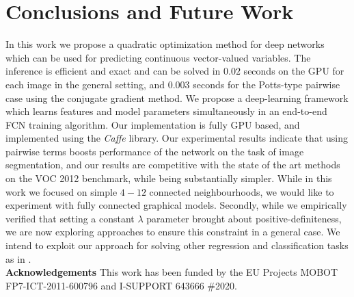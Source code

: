 \documentclass[runningheads]{llncs}
\begin{document}
\section{Conclusions and Future Work}
In this work we propose a quadratic optimization method for deep networks which
can be used for predicting continuous vector-valued variables. The inference is efficient
and exact and can be solved in $0.02$ seconds on the GPU for each image in the general setting, and $0.003$ seconds for the Potts-type pairwise case using the conjugate gradient method.
We propose a deep-learning framework which learns features and model parameters simultaneously in an end-to-end FCN training algorithm.
Our implementation is fully GPU based, and implemented using the \emph{Caffe} library.
Our experimental results indicate that using pairwise terms boosts performance of the network
on the task of image segmentation, and our results are competitive with the state of the art methods
on the VOC 2012 benchmark, while being substantially simpler. While in this work we focused on simple $4-12$ connected neighbourhoods, we would like to experiment with fully connected graphical
models. Secondly, while we empirically verified that setting a constant $\lambda$ parameter brought about positive-definiteness, we are now exploring approaches to ensure this constraint in a general case. We intend to exploit our approach for solving other regression and classification tasks as in \cite{eigen2015predicting,ubernet}.
\\[1mm]


\noindent \textbf{Acknowledgements}
This work has been funded by the EU Projects MOBOT FP7-ICT-2011-600796 and I-SUPPORT 643666 \#2020.
\end{document}
